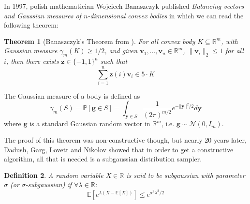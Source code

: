 \documentclass[12pt]{article}
\newtheorem{theorem}{Theorem}
\newtheorem{definition}[theorem]{Definition}
\begin{document}
In 1997, polish mathematician Wojciech Banaszczyk published \textit{Balancing vectors and Gaussian measures of $n$-dimensional convex bodies}\cite{banaszczyk1998balancing} in which we can read the following theorem:
\begin{theorem}[Banaszczyk's Theorem from \cite{banaszczyk1998balancing}]\label{banaszczyk}
For all convex body $K \subseteq \mathbb{R}^m$, with Gaussian measure $\gamma_m(K)\geq 1/2$, and given $\textbf{v}_1, \dots, \textbf{v}_n \in \mathbb{R}^m$, $\|\textbf{v}_i\|_2 \leq 1$ for all $i$, then there exists $ \textbf{z} \in \{-1, 1\}^n$ such that
$$\sum_{i=1}^n \textbf{z}(i)\textbf{v}_i \in 5 \cdot K $$
\end{theorem}
The Gaussian measure of a body is defined as $$\gamma_m(S) = \mathbb{P}[\textbf{g} \in S] = \int_{\textbf{y} \in S} \frac{1}{(2 \pi)^{m/2}} e^{-||\textbf{y}||^2/2} d\textbf{y}$$
    where $\textbf{g}$ is a standard Gaussian random vector in $\mathbb{R}^m$, i.e. $\textbf{g} \sim \mathcal{N}(0, I_m)$. 

The proof of this theorem was non-constructive though, but nearly 20 years later, Dadush, Garg, Lovett and Nikolov showed that in order to get a constructive algorithm, all that is needed is a subgaussian distribution sampler. 
\begin{definition}\label{def_subgaussianity_intro}
A random variable $X \in \mathbb{R}$ is said to be subgaussian with parameter $\sigma$ (or $\sigma$-subgaussian) if $ \forall\lambda\in\mathbb{R}$:
$$\mathbb{E}\left[e^{\lambda(X-\mathbb{E}[X])}\right]\leq e^{\sigma^2\lambda^2/2}$$
\end{definition}
\end{document}
